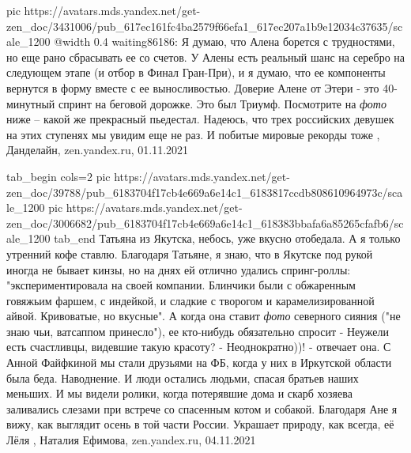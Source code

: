 \ifcmt
  pic https://avatars.mds.yandex.net/get-zen_doc/3431006/pub_617ec161fc4ba2579f66efa1_617ec207a1b9e12034c37635/scale_1200
  @width 0.4
\fi
waiting86186: Я думаю, что Алена борется с трудностями, но еще рано сбрасывать
ее со счетов. У Алены есть реальный шанс на серебро на следующем этапе (и отбор
в Финал Гран-При), и я думаю, что ее компоненты вернутся в форму вместе с ее
выносливостью. Доверие Алене от Этери - это 40-минутный спринт на беговой
дорожке.  Это был Триумф. Посмотрите на \emph{фото} ниже – какой же прекрасный
пьедестал.  Надеюсь, что трех российских девушек на этих ступенях мы увидим еще
не раз. И побитые мировые рекорды тоже
, 
Данделайн, zen.yandex.ru, 01.11.2021

\ifcmt
  tab_begin cols=2
     pic https://avatars.mds.yandex.net/get-zen_doc/39788/pub_6183704f17cb4e669a6e14c1_6183817ccdb808610964973c/scale_1200
     pic https://avatars.mds.yandex.net/get-zen_doc/3006682/pub_6183704f17cb4e669a6e14c1_618383bbafa6a85265cfafb6/scale_1200
  tab_end
\fi
Татьяна из Якутска, небось, уже вкусно отобедала. А я только утренний кофе
ставлю. Благодаря Татьяне, я знаю, что в Якутске под рукой иногда не бывает
кинзы, но на днях ей отлично удались спринг-роллы: "экспериментировала на своей
компании. Блинчики были с обжаренным говяжьим фаршем, с индейкой, и сладкие с
творогом и карамелизированной айвой. Кривоватые, но вкусные".  А когда она
ставит \emph{фото} северного сияния ("не знаю чьи, ватсаппом принесло"), ее
кто-нибудь обязательно спросит - Неужели есть счастливцы, видевшие такую
красоту?  - Неоднократно))! - отвечает она.  С Анной Файфкиной мы стали
друзьями на ФБ, когда у них в Иркутской области была беда. Наводнение. И люди
остались людьми, спасая братьев наших меньших. И мы видели ролики, когда
потерявшие дома и скарб хозяева заливались слезами при встрече со спасенным
котом и собакой.  Благодаря Ане я вижу, как выглядит осень в той части России.
Украшает природу, как всегда, её Лёля
, Наталия Ефимова, zen.yandex.ru, 04.11.2021

